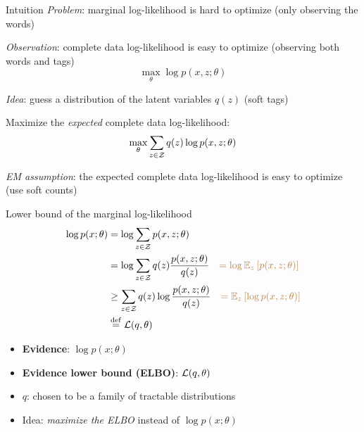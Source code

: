 \documentclass[usenames,dvipsnames,notes]{beamer}
\begin{document}
\begin{frame}
    {Intuition}
    \emph{Problem}: marginal log-likelihood is hard to optimize (only observing the words)

    \emph{Observation}: complete data log-likelihood is easy to optimize (observing both words and tags)
    $$
    \max_\theta \log p(x,z;\theta)
    $$

    \emph{Idea}: guess a distribution of the latent variables $q(z)$ (soft tags)

    Maximize the \emph{expected} complete data log-likelihood:
    $$
    \max_\theta \sum_{z\in\mathcal{Z}} q(z) \log p(x,z;\theta)
    $$

    \emph{EM assumption}: the expected complete data log-likelihood is easy to optimize (use soft counts)
\end{frame}

\begin{frame}
    {Lower bound of the marginal log-likelihood}
    \begin{align*}
        \log p(x;\theta) &= \log \sum_{z\in\mathcal{Z}} p(x,z;\theta) \\
        &= \log \sum_{z\in\mathcal{Z}} q(z) \frac{p(x,z;\theta)}{q(z)}
        \quad {\color{brown}= \log \ensuremath{\mathbb{E}}_z\ensuremath{\left[ p(x,z;\theta) \right]}}\\
        &\ge \sum_{z\in\mathcal{Z}} q(z) \log \frac{p(x,z;\theta)}{q(z)}
        \quad {\color{brown}= \ensuremath{\mathbb{E}}_z\ensuremath{\left[ \log p(x,z;\theta) \right]}} \\
        &\stackrel{\rm def}{=} \mathcal{L}(q, \theta)
    \end{align*}
    \vspace{-2em}
    \begin{itemize}
        \item \textbf{Evidence}:  $\log p(x;\theta)$
        \item \textbf{Evidence lower bound (ELBO)}: $\mathcal{L}(q, \theta)$
        \item $q$: chosen to be a family of tractable distributions
        \item Idea: \emph{maximize the ELBO} instead of $\log p(x;\theta)$
    \end{itemize}
\end{frame}
\end{document}
